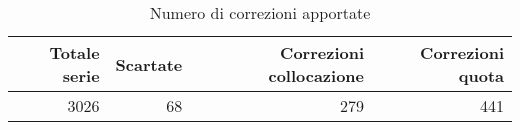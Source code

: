 \begin{table}[ht]
  \caption{Numero di correzioni apportate}\label{tab:tab:n-corrections}
  \centering
  \begin{tabular}[t]{r r r r}
    \toprule
    Totale serie & Scartate & Correzioni collocazione & Correzioni quota\\
    \midrule
    3026 & 68 & 279 & 441\\
    \bottomrule
  \end{tabular}
\end{table}
